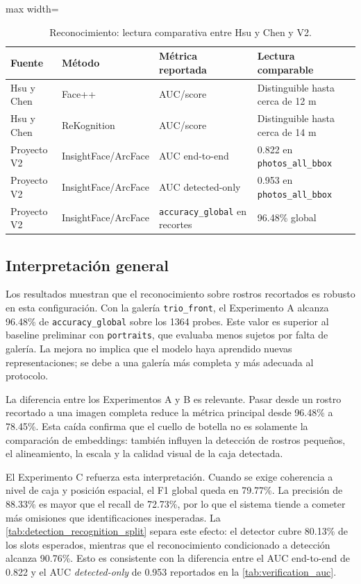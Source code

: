 \documentclass[11pt]{article}
\newcommand{\accglobal}{\texttt{accuracy\_global}}
\begin{document}
\begin{table}[H]
\centering
\caption{Reconocimiento: lectura comparativa entre Hsu y Chen y V2.}
\label{tab:paper_recognition}
\begin{adjustbox}{max width=\textwidth}
\begin{tabular}{llll}
\toprule
Fuente & M\'etodo & M\'etrica reportada & Lectura comparable \\
\midrule
Hsu y Chen \cite{hsu2015issues} & Face++ & AUC/score & Distinguible hasta cerca de 12 m \\
Hsu y Chen \cite{hsu2015issues} & ReKognition & AUC/score & Distinguible hasta cerca de 14 m \\
Proyecto V2 & InsightFace/ArcFace & AUC end-to-end & 0.822 en \texttt{photos\_all\_bbox} \\
Proyecto V2 & InsightFace/ArcFace & AUC detected-only & 0.953 en \texttt{photos\_all\_bbox} \\
Proyecto V2 & InsightFace/ArcFace & \accglobal{} en recortes & 96.48\% global \\
\bottomrule
\end{tabular}
\end{adjustbox}
\end{table}

\subsection{Interpretaci\'on general}
\label{sec:interpretacion_general}

Los resultados muestran que el reconocimiento sobre rostros recortados es robusto en esta configuraci\'on. Con la galer\'ia \texttt{trio\_front}, el Experimento A alcanza 96.48\% de \accglobal{} sobre los 1364 probes. Este valor es superior al baseline preliminar con \texttt{portraits}, que evaluaba menos sujetos por falta de galer\'ia. La mejora no implica que el modelo haya aprendido nuevas representaciones; se debe a una galer\'ia m\'as completa y m\'as adecuada al protocolo.

La diferencia entre los Experimentos A y B es relevante. Pasar desde un rostro recortado a una imagen completa reduce la m\'etrica principal desde 96.48\% a 78.45\%. Esta ca\'ida confirma que el cuello de botella no es solamente la comparaci\'on de embeddings: tambi\'en influyen la detecci\'on de rostros peque\~nos, el alineamiento, la escala y la calidad visual de la caja detectada.

El Experimento C refuerza esta interpretaci\'on. Cuando se exige coherencia a nivel de caja y posici\'on espacial, el F1 global queda en 79.77\%. La precisi\'on de 88.33\% es mayor que el recall de 72.73\%, por lo que el sistema tiende a cometer m\'as omisiones que identificaciones inesperadas. La \autoref{tab:detection_recognition_split} separa este efecto: el detector cubre 80.13\% de los slots esperados, mientras que el reconocimiento condicionado a detecci\'on alcanza 90.76\%. Esto es consistente con la diferencia entre el AUC end-to-end de 0.822 y el AUC \textit{detected-only} de 0.953 reportados en la \autoref{tab:verification_auc}.
\end{document}
